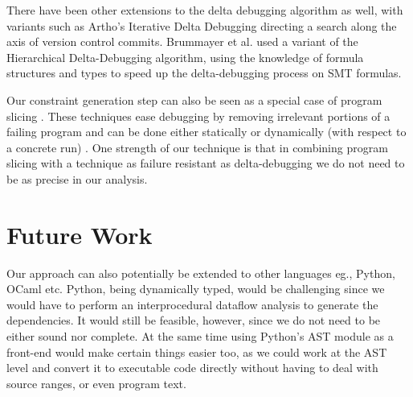 \documentclass[11pt]{article}
\begin{document}
There have been other extensions to the delta debugging algorithm as well, with
variants such as Artho's Iterative Delta Debugging \cite{idd} directing a search
along the axis of version control commits. Brummayer et al. \cite{smt} used a
variant of the Hierarchical Delta-Debugging algorithm, using the knowledge of
formula structures and types to speed up the delta-debugging process on SMT
formulas.

Our constraint generation step can also be seen as a special case of program
slicing \cite{weiser81} \cite{tip94}. These techniques ease debugging by
removing irrelevant portions of a failing program and can be done either
statically or dynamically (with respect to a concrete run) \cite{agrawal90}. One
strength of our technique is that in combining program slicing with a technique
as failure resistant as delta-debugging we do not need to be as precise in our
analysis.


\section{Future Work}
Our approach can also potentially be extended to other languages eg., Python,
OCaml etc. Python, being dynamically typed, would be challenging since we would
have to perform an interprocedural dataflow analysis to generate the
dependencies. It would still be feasible, however, since we do not need to be
either sound nor complete. At the same time using Python's AST module as a
front-end would make certain things easier too, as we could work at the AST
level and convert it to executable code directly without having to deal with
source ranges, or even program text.

 
\end{document}
